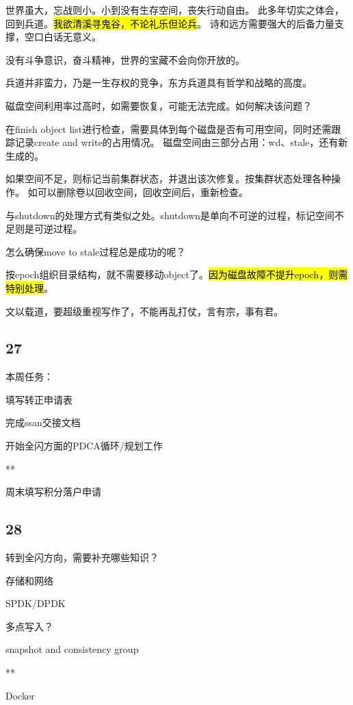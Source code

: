 世界虽大，忘战则小。小到没有生存空间，丧失行动自由。
此多年切实之体会，回到兵道。\hl{我欲清溪寻鬼谷，不论礼乐但论兵}。
诗和远方需要强大的后备力量支撑，空口白话无意义。

没有斗争意识，奋斗精神，世界的宝藏不会向你开放的。

兵道并非蛮力，乃是一生存权的竞争，东方兵道具有哲学和战略的高度。

\hrulefill

磁盘空间利用率过高时，如需要恢复，可能无法完成。如何解决该问题？

在finish object list进行检查，需要具体到每个磁盘是否有可用空间，同时还需跟踪记录create and write的占用情况。
磁盘空间由三部分占用：wd、stale，还有新生成的。

如果空间不足，则标记当前集群状态，并退出该次修复。按集群状态处理各种操作。
如可以删除卷以回收空间，回收空间后，重新检查。

与shutdown的处理方式有类似之处。shutdown是单向不可逆的过程，标记空间不足则是可逆过程。

\hrulefill

怎么确保move to stale过程总是成功的呢？

按epoch组织目录结构，就不需要移动object了。\hl{因为磁盘故障不提升epoch，则需特别处理}。

\hrulefill

文以载道，要超级重视写作了，不能再乱打仗，言有宗，事有君。

\subsection{27}

本周任务：
\begin{enumbox}
\item 填写转正申请表
\item 完成ssan交接文档
\item 开始全闪方面的PDCA循环/规划工作
\item ***
\item 周末填写积分落户申请
\end{enumbox}

\subsection{28}

转到全闪方向，需要补充哪些知识？
\begin{enumbox}
\item 存储和网络
\item SPDK/DPDK
\item 多点写入？
\item snapshot and consistency group
\item ***
\item Docker
\end{enumbox}

